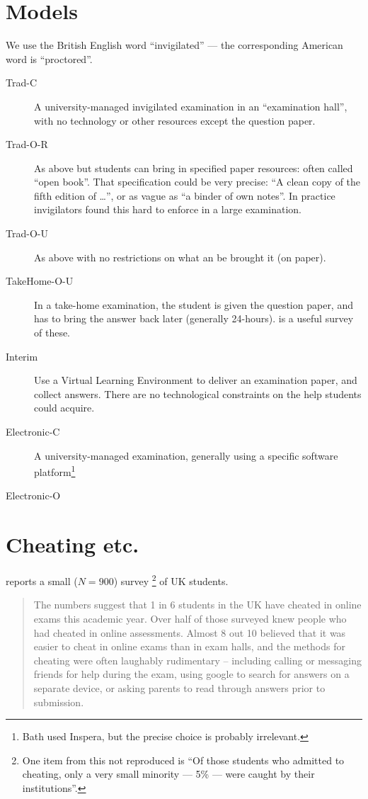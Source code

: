 \documentclass{article}
\begin{document}
\section{Models}
We use the British English word ``invigilated'' --- the corresponding American word is ``proctored''.
\begin{description}
\item[Trad-C]A university-managed invigilated examination in an ``examination hall'', with no technology or other resources except the question paper.
\item[Trad-O-R]As above but students can bring in specified paper resources: often called ``open book''. That specification could be very precise: ``A clean copy of the fifth edition of \dots'', or as vague as ``a binder of own notes''.  In practice invigilators found this hard to enforce in a large examination.
\item[Trad-O-U]As above with no restrictions on what an be brought it (on paper).
\item[TakeHome-O-U]In a take-home examination, the student is given the question paper, and has to bring the answer back later (generally 24-hours). \cite{bengtsson2019a} is a useful survey of these.
\item[Interim]Use a Virtual Learning Environment to deliver an examination paper, and collect answers. There are no technological constraints on the help students could acquire.
\item[Electronic-C]A university-managed examination, generally using a specific software platform\footnote{Bath used Inspera, but the precise choice is probably irrelevant.} 
\item[Electronic-O]
\end{description}
\section{Cheating etc.}
\cite{Dickinson2022a} reports a small ($N=900$) survey \cite{AcademicAppeals2022a}\footnote{One item from this not reproduced is ``Of those students who admitted to cheating, only a very small minority --- 5\% --- were caught by their institutions''. } of UK students.
\begin{quote}
  The numbers suggest that 1 in 6 students in the UK have cheated in online exams this academic year. Over half of those surveyed knew people who had cheated in online assessments. Almost 8 out 10 believed that it was easier to cheat in online exams than in exam halls, and the methods for cheating were often laughably rudimentary – including calling or messaging friends for help during the exam, using google to search for answers on a separate device, or asking parents to read through answers prior to submission.
\end{quote}

\end{document}
